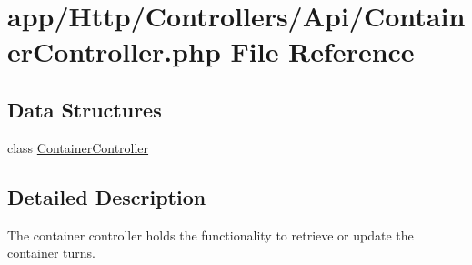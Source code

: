 \hypertarget{_container_controller_8php}{}\section{app/\+Http/\+Controllers/\+Api/\+Container\+Controller.php File Reference}
\label{_container_controller_8php}
\subsection*{Data Structures}
\begin{DoxyCompactItemize}
\item 
class \mbox{\hyperlink{class_app_1_1_http_1_1_controllers_1_1_a_p_i_1_1_container_controller}{Container\+Controller}}
\end{DoxyCompactItemize}


\subsection{Detailed Description}
The container controller holds the functionality to retrieve or update the container turns. 